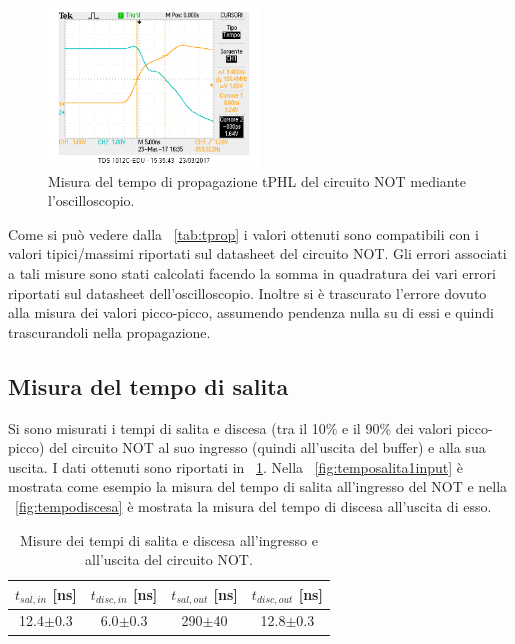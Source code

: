 \documentclass[a4paper,10pt]{article}
\begin{document}
{\begin{figure}[H]
	\centering
	\includegraphics[width=0.5\textwidth]{../grafici/tphlNOT.png}
	\caption{Misura del tempo di propagazione tPHL del circuito NOT mediante l'oscilloscopio.}
	\label{fig:tphlNOT}
\end{figure}

Come si può vedere dalla \tablename{~\ref{tab:tprop}} i valori ottenuti sono compatibili con i valori tipici/massimi riportati sul datasheet del circuito NOT. Gli errori associati a tali misure sono stati calcolati facendo la somma in quadratura dei vari errori riportati sul datasheet dell'oscilloscopio. Inoltre si è trascurato l'errore dovuto alla misura dei valori picco-picco, assumendo pendenza nulla su di essi e quindi trascurandoli nella propagazione.

\subsection{Misura del tempo di salita}
Si sono misurati i tempi di salita e discesa (tra il 10\% e il 90\% dei valori picco-picco) del circuito NOT al suo ingresso (quindi all'uscita del buffer) e alla sua uscita. I dati ottenuti sono riportati in \tablename{~\ref{tab:tsaldisc}}. Nella \figurename{~\ref{fig:temposalita1input}} è mostrata come esempio la misura del tempo di salita all'ingresso del NOT e nella \figurename{~\ref{fig:tempodiscesa}} è mostrata la misura del tempo di discesa all'uscita di esso.

\begin{table}[H]
	\centering
	\begin{tabular}{c|c|c|c}
	$t_{sal,in}$ [ns] & $t_{disc,in}$ [ns] & $t_{sal,out}$ [ns] & $t_{disc,out}$ [ns]\\
	\hline
	12.4$\pm$0.3 & 6.0$\pm$0.3 & 290$\pm$40 &12.8$\pm$0.3\\
	\hline
	\end{tabular}
	\caption{Misure dei tempi di salita e discesa all'ingresso e all'uscita del circuito NOT.}
	\label{tab:tsaldisc}
\end{table}


}
\end{document}
